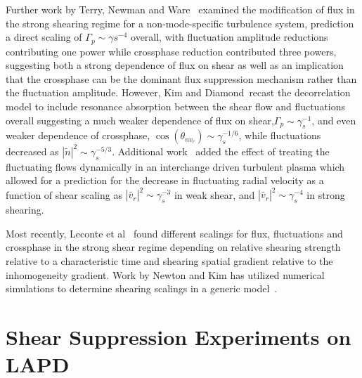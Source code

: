 \documentclass[aip,pop,amsmath,amssymb,reprint,superscriptaddress]{revtex4-1} %
\begin{document}
Further work by Terry, Newman and Ware~\cite{terry01} examined the modification of flux in the strong shearing regime for a non-mode-specific turbulence system, prediction a direct scaling of $\Gamma_{p} \sim \gamma{s}^{-4}$ overall, with fluctuation amplitude reductions contributing one power while crossphase reduction contributed three powers, suggesting both a strong dependence of flux on shear as well as an implication that the crossphase can be the dominant flux suppression mechanism rather than the fluctuation amplitude. However, Kim and Diamond~\cite{kim03}recast the decorrelation model to include resonance absorption between the shear flow and fluctuations overall suggesting a much weaker dependence of flux on shear,$\Gamma_{p} \sim \gamma_{s}^{-1}$, and even weaker dependence of crossphase, $\cos(\theta_{nv_{r}}) \sim \gamma_{s}^{-1/6}$, while fluctuations decreased as $|\tilde{n}|^{2} \sim \gamma_{s}^{-5/3}$. Additional work~\cite{kim04} added the effect of treating the fluctuating flows dynamically in an interchange driven turbulent plasma which allowed for a prediction for the decrease in fluctuating radial velocity as a function of shear scaling as $|\tilde{v_{r}}|^{2} \sim \gamma_{s}^{-3}$ in weak shear, and $|\tilde{v_{r}}|^{2} \sim \gamma_{s}^{-4}$ in strong shearing.

Most recently, Leconte et al~\cite{leconte06} found different scalings for flux, fluctuations and crossphase in the strong shear regime depending on relative shearing strength relative to a characteristic time and shearing spatial gradient relative to the inhomogeneity gradient. Work by Newton and Kim has utilized numerical simulations to determine shearing scalings in a generic model~\cite{newton07,newton11}.

\section{Shear Suppression Experiments on LAPD}
\end{document}

